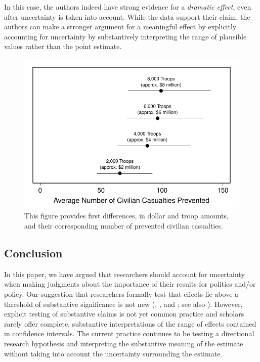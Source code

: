 \documentclass[12pt]{article}
\begin{document}
In this case, the authors indeed have strong evidence for a \emph{dramatic effect}, even after uncertainty is taken into account. While the data support their claim, the authors can make a stronger argument for a meaningful effect by explicitly accounting for uncertainty by substantively interpreting the range of plausible values rather than the point estimate.

\begin{figure}[H]
\begin{center}
\includegraphics[scale = .8]{figs/hks-ci.pdf}
\caption{This figure provides first differences, in dollar and troop amounts, and their corresponding number of prevented civilian casualties.}\label{fig:hks-ci}
\end{center}
\end{figure}


\subsection*{Conclusion}

In this paper, we have argued that researchers should account for uncertainty when making judgments about the importance of their results for politics and/or policy. Our suggestion that researchers formally test that effects lie above a threshold of substantive significance is not new (\citealt{Achen1982}, \citealt{Rainey2014}, and \citealt{Gross2014}; see also \citealt{EsareyDanneman2014}). However, explicit testing of substantive claims is not yet common practice and scholars rarely offer complete, substantive interpretations of the range of effects contained in confidence intervals. The current practice continues to be testing a directional research hypothesis and interpreting the substantive meaning of the estimate without taking into account the uncertainty surrounding the estimate. 
\end{document}

